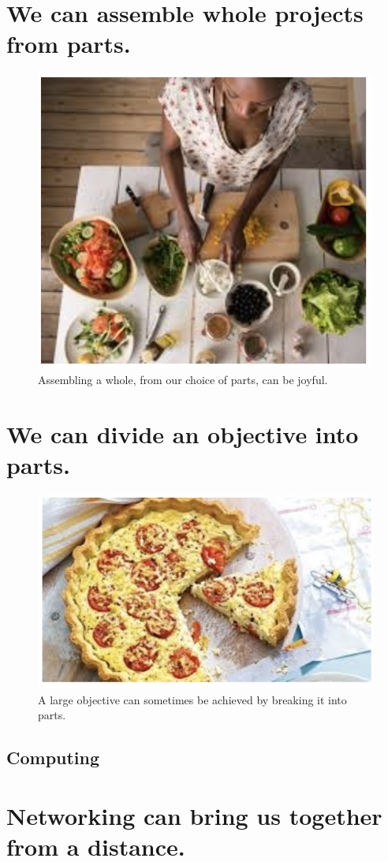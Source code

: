 \documentclass[]{report}
\begin{document}
\chapter{We can assemble whole projects from parts.}
\begin{figure}
	\centering
	\includegraphics[width=0.7\linewidth]{aWholeComposedOfParts}
	\caption{Assembling a whole, from our choice of parts, can be joyful.}
	\label{fig:awholecomposedofparts}
\end{figure}

\chapter{We can divide an objective into parts.}
\begin{figure}
	\centering
	\includegraphics[width=0.7\linewidth]{DivideIntoParts}
	\caption{A large objective can sometimes be achieved by breaking it into parts.}
	\label{fig:divideintoparts}
\end{figure}
\section{Computing}


\chapter{Networking can bring us together from a distance.}
\end{document}
